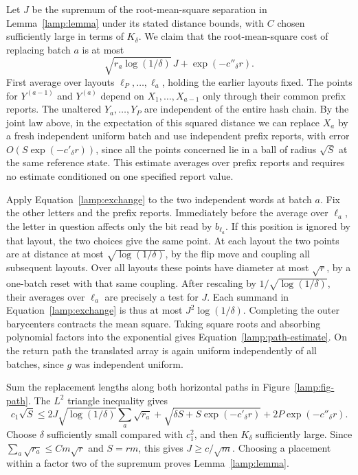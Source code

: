 Let \(J\) be the supremum of the root-mean-square separation in
Lemma~\ref{lamp:lemma} under its stated distance bounds, with \(C\)
chosen sufficiently large in terms of \(K_\delta\).
We claim that the root-mean-square cost of replacing batch \(a\) is at most
\begin{equation}\label{lamp:path-estimate}
 \sqrt{r_a\log(1/\delta)}\,J+\exp(-c''_\delta r).
\end{equation}
First average over layouts \(\ell_P,\ldots,\ell_a\), holding the
earlier layouts fixed. The points for \(Y^{(a-1)}\) and \(Y^{(a)}\)
depend on \(X_1,\ldots,X_{a-1}\) only through their common prefix
reports. The unaltered \(Y_a,\ldots,Y_P\) are independent
of the entire hash chain. By the joint law above, in the
expectation of this squared distance we can replace \(X_a\) by a fresh
independent uniform batch and use independent prefix reports, with
error \(O(S\exp(-c'_\delta r))\), since all the points concerned lie in a
ball of radius \(\sqrt S\) at the same reference state. This estimate
averages over prefix reports and requires no estimate conditioned on
one specified report value.

Apply Equation~\eqref{lamp:exchange} to the two independent words at batch \(a\).
Fix the other letters and the prefix reports. Immediately before the
average over \(\ell_a\), the letter in question affects only the bit
read by \(b_{\ell_a}\). If this position is ignored by that layout, the
two choices give the same point. At each layout the two points are at
distance at most \(\sqrt{\log(1/\delta)}\), by the flip move and coupling
all subsequent layouts. Over all layouts these points have diameter
at most \(\sqrt r\), by a one-batch reset with that same coupling.
After rescaling by \(1/\sqrt{\log(1/\delta)}\), their averages over
\(\ell_a\) are precisely a test for \(J\). Each summand in
Equation~\eqref{lamp:exchange} is thus at most \(J^2\log(1/\delta)\).
Completing the outer barycenters contracts the mean square. Taking
square roots and absorbing polynomial factors into the exponential
gives Equation~\eqref{lamp:path-estimate}. On the return path the translated
array is again uniform independently of all batches, since \(g\) was
independent uniform.

Sum the replacement lengths along both horizontal paths in
Figure~\ref{lamp:fig-path}. The \(L^2\) triangle inequality gives
\[
 c_1\sqrt S\le
 2J\sqrt{\log(1/\delta)}\sum_a\sqrt{r_a}
 +\sqrt{\delta S+S\exp(-c'_\delta r)}
 +2P\exp(-c''_\delta r).
\]
Choose \(\delta\) sufficiently small compared with \(c_1^2\), and then
\(K_\delta\) sufficiently large. Since \(\sum_a\sqrt{r_a}\le C m\sqrt r\)
and \(S=rm\), this gives \(J\ge c/\sqrt m\). Choosing a placement
within a factor two of the supremum proves Lemma~\ref{lamp:lemma}.

